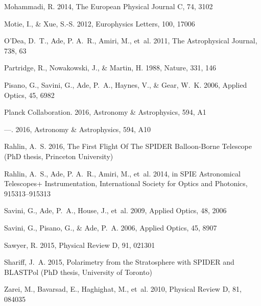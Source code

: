 \documentclass[twocolumn]{aastex61}
\begin{document}
\begin{thebibliography}{}
Mohammadi, R. 2014, The European Physical Journal C, 74, 3102

Motie, I., \& Xue, S.-S. 2012, Europhysics Letters, 100, 17006

O'Dea, D.~T., Ade, P. A.~R., Amiri, M., {et~al.} 2011, The Astrophysical
  Journal, 738, 63

Partridge, R., Nowakowski, J., \& Martin, H. 1988, Nature, 331, 146

Pisano, G., Savini, G., Ade, P.~A., Haynes, V., \& Gear, W.~K. 2006, Applied
  Optics, 45, 6982

{Planck Collaboration}. 2016{}, Astronomy \& Astrophysics, 594, A1

---. 2016{}, Astronomy \& Astrophysics, 594, A10

Rahlin, A.~S. 2016, The First Flight Of The {SPIDER} Balloon-Borne Telescope
  (PhD thesis, Princeton University)

Rahlin, A.~S., Ade, P. A.~R., Amiri, M., {et~al.} 2014, in SPIE Astronomical
  Telescopes+ Instrumentation, International Society for Optics and Photonics,
  915313--915313

Savini, G., Ade, P.~A., House, J., {et~al.} 2009, Applied Optics, 48, 2006

Savini, G., Pisano, G., \& Ade, P.~A. 2006, Applied Optics, 45, 8907

Sawyer, R. 2015, Physical Review D, 91, 021301

Shariff, J.~A. 2015, Polarimetry from the Stratosphere with {SPIDER} and
  {BLASTPol} (PhD thesis, University of Toronto)

Zarei, M., Bavarsad, E., Haghighat, M., {et~al.} 2010, Physical Review D, 81,
  084035

\end{thebibliography}
\end{document}
